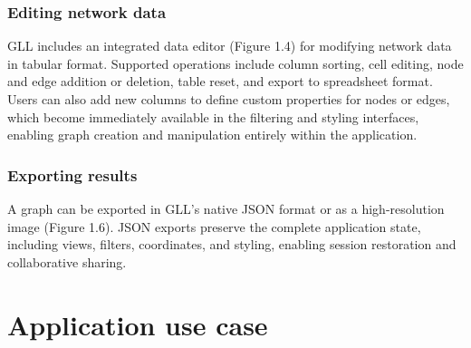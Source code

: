 \subsubsection{Editing network data}
GLL includes an integrated data editor (Figure 1.4) for modifying network data in tabular format. Supported operations include column sorting, cell editing, node and edge addition or deletion, table reset, and export to spreadsheet format. Users can also add new columns to define custom properties for nodes or edges, which become immediately available in the filtering and styling interfaces, enabling graph creation and manipulation entirely within the application.

\subsubsection{Exporting results}
A graph can be exported in GLL's native JSON format or as a high-resolution image (Figure 1.6). JSON exports preserve the complete application state, including views, filters, coordinates, and styling, enabling session restoration and collaborative sharing.

\section{Application use case}
